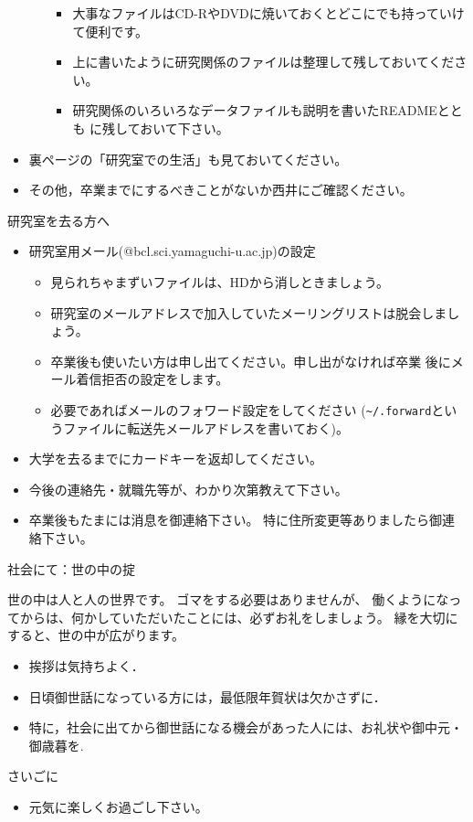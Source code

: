 \documentclass[11pt]{jarticle}
\begin{document}
\begin{itemize}
\begin{itemize}
    \begin{itemize}
    \item 大事なファイルはCD-RやDVDに焼いておくとどこにでも持っていけ
      て便利です。
    \item 上に書いたように研究関係のファイルは整理して残しておいてください。
    \item 研究関係のいろいろなデータファイルも説明を書いたREADMEととも
      に残しておいて下さい。
    \end{itemize}
  \end{itemize}
\item 裏ページの「研究室での生活」も見ておいてください。
\item その他，卒業までにするべきことがないか西井にご確認ください。
\end{itemize}

\vspace{5mm}
\begin{center}
  {\LARGE 研究室を去る方へ}
\end{center}

\begin{itemize}
\item 研究室用メール(@bcl.sci.yamaguchi-u.ac.jp)の設定
  \begin{itemize}
  \item 見られちゃまずいファイルは、HDから消しときましょう。
  \item 研究室のメールアドレスで加入していたメーリングリストは脱会しましょう。
  \item 卒業後も使いたい方は申し出てください。申し出がなければ卒業
  後にメール着信拒否の設定をします。
  \item 必要であればメールのフォワード設定をしてください
  (\verb|~/.forward|というファイルに転送先メールアドレスを書いておく)。 
  \end{itemize}
\item 大学を去るまでにカードキーを返却してください。
\item 今後の連絡先・就職先等が、わかり次第教えて下さい。
\item 卒業後もたまには消息を御連絡下さい。
  特に住所変更等ありましたら御連絡下さい。 
\end{itemize}

\begin{center}
  {\large 社会にて：世の中の掟}
\end{center}

世の中は人と人の世界です。
ゴマをする必要はありませんが、
働くようになってからは、何かしていただいたことには、必ずお礼をしましょう。
縁を大切にすると、世の中が広がります。
\begin{itemize}
\item 挨拶は気持ちよく．
\item 日頃御世話になっている方には，最低限年賀状は欠かさずに．
\item 特に，社会に出てから御世話になる機会があった人には、お礼状や御中元・御歳暮を.
\end{itemize}

\vspace*{1cm}
\begin{center}
  {\large さいごに}
\end{center}
\begin{itemize}
\item 元気に楽しくお過ごし下さい。
\end{itemize}
\end{document}

